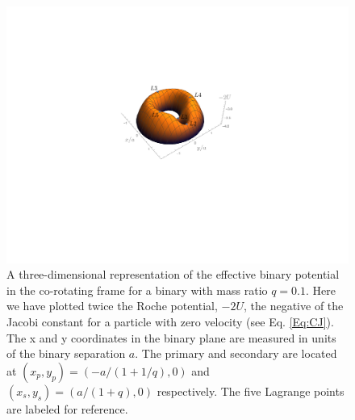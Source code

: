 \documentclass[usenatbib]{mnras}
\begin{document}
\begin{figure}
\begin{center}
\includegraphics[scale=0.55]{3D_RochePot_q0p1.pdf} 
\end{center}
\caption{A three-dimensional representation of the effective binary
  potential in the co-rotating frame for a binary with mass ratio
  $q=0.1$. Here we have plotted twice the Roche potential, $-2U$, the negative of the Jacobi
  constant for a particle with zero velocity (see Eq. \ref{Eq:CJ}). The
  x and y coordinates in the binary plane are measured in units of the
  binary separation $a$. The primary and secondary are located at
  $(x_p,y_p) = (-a/(1+1/q), 0)$ and $(x_s,y_s) = (a/(1+q), 0)$
  respectively. The five Lagrange points are labeled for reference.}
\label{Fig:Roche3D}
\end{figure}
\end{document}
